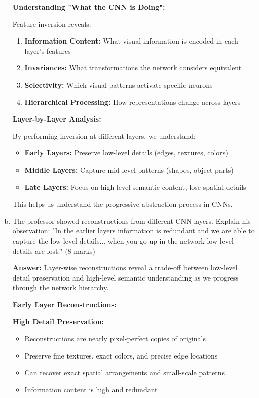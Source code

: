 \documentclass[12pt]{article}
\newcommand{\answer}[1]{{\color{answercolor}\textbf{Answer:} #1}}
\newcommand{\explanation}[1]{{\color{explanationcolor}#1}}
\begin{document}
\begin{enumerate}[(a)]
{    \textbf{Understanding "What the CNN is Doing":}
    
    Feature inversion reveals:
    \begin{enumerate}
        \item \textbf{Information Content:} What visual information is encoded in each layer's features
        \item \textbf{Invariances:} What transformations the network considers equivalent
        \item \textbf{Selectivity:} Which visual patterns activate specific neurons
        \item \textbf{Hierarchical Processing:} How representations change across layers
    \end{enumerate}
    
    \textbf{Layer-by-Layer Analysis:}
    
    By performing inversion at different layers, we understand:
    \begin{itemize}
        \item \textbf{Early Layers:} Preserve low-level details (edges, textures, colors)
        \item \textbf{Middle Layers:} Capture mid-level patterns (shapes, object parts)
        \item \textbf{Late Layers:} Focus on high-level semantic content, lose spatial details
    \end{itemize}
    
    This helps us understand the progressive abstraction process in CNNs.
    }
    
    \item The professor showed reconstructions from different CNN layers. Explain his observation: "In the earlier layers information is redundant and we are able to capture the low-level details... when you go up in the network low-level details are lost." \hfill (8 marks)
    
    \answer{Layer-wise reconstructions reveal a trade-off between low-level detail preservation and high-level semantic understanding as we progress through the network hierarchy.}
    
    \explanation{
    \textbf{Early Layer Reconstructions:}
    
    \textbf{High Detail Preservation:}
    \begin{itemize}
        \item Reconstructions are nearly pixel-perfect copies of originals
        \item Preserve fine textures, exact colors, and precise edge locations
        \item Can recover exact spatial arrangements and small-scale patterns
        \item Information content is high and redundant
    \end{itemize}
    
}
\end{enumerate}
\end{document}
